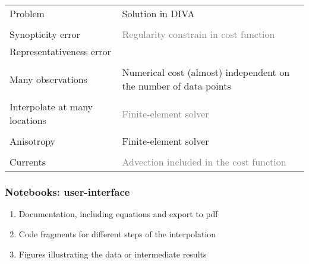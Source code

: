 
\begin{frame}
\frametitle{~}
\footnotesize
\begin{table}[c]
\centering
\begin{tabular}{R{5.5cm}|L{5.5cm}}
\textcolor{bluesdn}{Problem}			& \textcolor{bluesdn}{Solution in DIVA}		\\
										& 												\\
 Synopticity error 			& \textcolor{gray}{Regularity constrain in cost function}		\\
 Representativeness error		& 												\\
										& 												\\
 Many observations			& Numerical cost (almost) independent on the number of data points\\
										& 												\\
 Interpolate at many locations	& \textcolor{gray}{Finite-element solver}	\\
										& 												\\
 Anisotropy					& Finite-element solver							\\ 
										& 												\\
 Currents 						& \textcolor{gray}{Advection included in the cost function}		\\


\end{tabular}
\end{table}
\end{frame}

\begin{frame}[t]
\frametitle{Notebooks: user-interface}

\begin{enumerate}
\item Documentation, including equations and export to pdf
\item Code fragments for different steps of the interpolation
\item Figures illustrating the data or intermediate results
\end{enumerate}


\end{frame}

